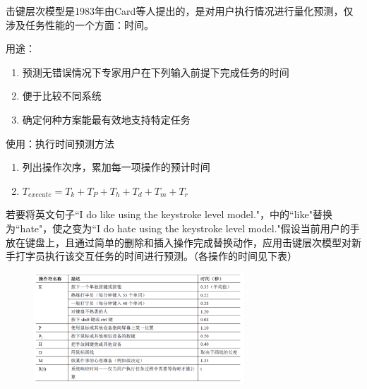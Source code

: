 \begin{solution}
击键层次模型是1983年由Card等人提出的，是对用户执行情况进行量化预测，仅涉及任务性能的一个方面：时间。

用途：
\vspace{-0.8em}
\begin{multicols}{2}
    \begin{enumerate}[label=\arabic*.]
        \item 预测无错误情况下专家用户在下列输入前提下完成任务的时间
        \item 便于比较不同系统
        \item 确定何种方案能最有效地支持特定任务
    \end{enumerate}
\end{multicols}
\vspace{-1em}

使用：执行时间预测方法
\vspace{-0.8em}
\begin{multicols}{2}
    \begin{enumerate}[label=\arabic*.]
        \item 列出操作次序，累加每一项操作的预计时间
        \item $T_{execute} = T_k + T_P + T_h + T_d + T_m + T_r$
    \end{enumerate}
\end{multicols}
\vspace{-1em}
\end{solution}



\begin{problem}[2021]
若要将英文句子``I do like using the keystroke level model."，中的``like"替换为``hate"，使之变为``I do hate using the keystroke level model."假设当前用户的手放在键盘上，且通过简单的删除和插入操作完成替换动作，应用击键层次模型对新手打字员执行该交互任务的时间进行预测。（各操作的时间见下表）
\begin{figure}[H]
    \vspace{-0.5em}
    \centering
    \includegraphics[width=0.7\textwidth]{2.png}
    \vspace{-1em}
\end{figure}
\end{problem}
    
